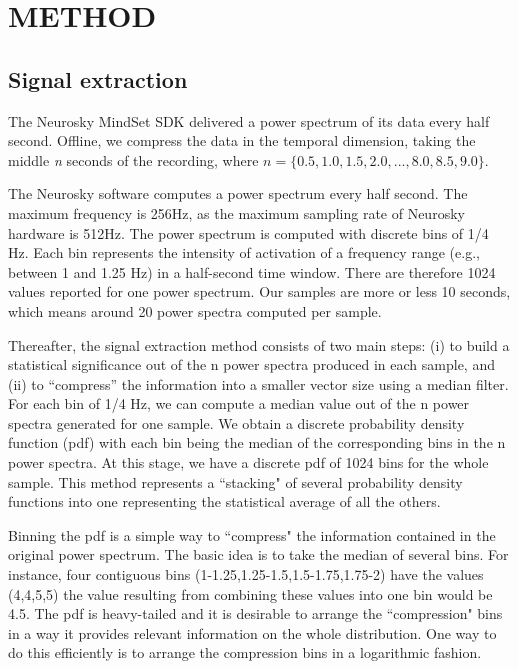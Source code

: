 \section{\uppercase{Method}}

\subsection{Signal extraction}

The Neurosky MindSet SDK delivered a power spectrum of its data every half second. Offline, we compress the data in the temporal dimension, taking the middle \textit{n} seconds of the recording, where $n = \{0.5, 1.0,1.5, 2.0,...,8.0, 8.5, 9.0\}$. 

The Neurosky software computes a power spectrum every half second. The maximum frequency is 256Hz, as the maximum sampling rate of Neurosky hardware is 512Hz. The power spectrum is computed with discrete bins of 1/4 Hz. Each bin represents the intensity of activation of a frequency range (e.g., between 1 and 1.25 Hz) in a half-second time window. There are therefore 1024 values reported for one power spectrum. Our samples are more or less 10 seconds, which means around 20 power spectra computed per sample.

Thereafter, the signal extraction method consists of two main steps: (i) to build a statistical significance out of the n power spectra produced in each sample, and (ii) to ``compress'' the information into a smaller vector size using a median filter. For each bin of 1/4 Hz, we can compute a median value out of the n power spectra generated for one sample. We obtain a discrete probability density function (pdf) with each bin being the median of the corresponding bins in the n power spectra. At this stage, we have a discrete pdf of 1024 bins for the whole sample. This method represents a ``stacking" of several probability density functions into one representing the statistical average of all the others.

Binning the pdf is a simple way to ``compress" the information contained in the original power spectrum. The basic idea is to take the median of several bins. For instance, four contiguous bins (1-1.25,1.25-1.5,1.5-1.75,1.75-2) have the values (4,4,5,5) the value resulting from combining these values into one bin would be 4.5. The pdf is heavy-tailed and it is desirable to arrange the ``compression" bins in a way it provides relevant information on the whole distribution. One way to do this efficiently is to arrange the compression bins in a logarithmic fashion.

